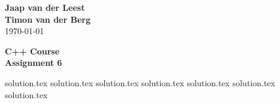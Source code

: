 \documentclass{article}[9pt]
\begin{document}
\begin{flushright}
	\textbf{Jaap van der Leest\\ Timon van der Berg \\ }
\today
\end{flushright}

\begin{center}
\textbf{C++ Course \\
Assignment 6} \\
\end{center}

\tableofcontents


    {solution.tex}
    {solution.tex}
    {solution.tex}
    {solution.tex}
    {solution.tex}
    {solution.tex}
    {solution.tex}
 
\end{document}
